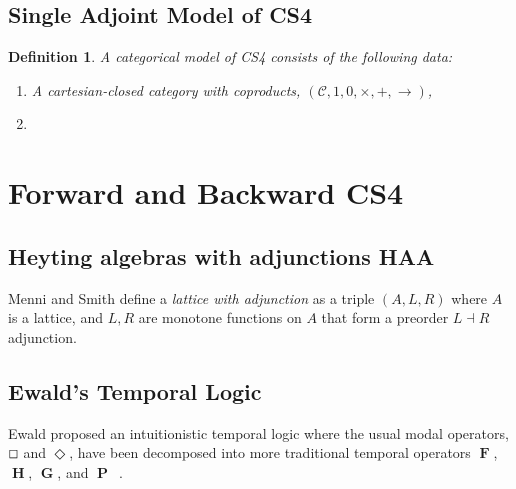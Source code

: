 \documentclass{article}
\renewcommand{\Box}{\oblong}
\newcommand{\F}{\mathop{\textbf{F}}}
\renewcommand{\P}{\mathop{\textbf{P}}}
\newcommand{\G}{\mathop{\textbf{G}}}
\renewcommand{\H}{\mathop{\textbf{H}}}
\newcommand{\cat}[1]{\mathcal{#1}}
\newcommand{\pd}[0]{\times}
\newcommand{\ihom}[0]{\rightarrow}
\newtheorem{definition}[theorem]{Definition}
\begin{document}
\subsection{Single Adjoint Model of CS4}
\label{subsec:single_adjoint_model_of_cs4}

\begin{definition}
  \label{def:CS4-single-adjoint-cat-model}
  A categorical model of CS4 consists of the following data:
  \begin{enumerate}
  \item A cartesian-closed category with coproducts, $(\cat{C},1,0,\pd,+,\ihom)$,
  \item 
  \end{enumerate}
\end{definition}



\section{Forward and Backward CS4}


\subsection{Heyting algebras with adjunctions HAA}
Menni and Smith \cite{Menni:2014} define a \textit{lattice with
  adjunction} as a triple $(A, L, R)$ where $A$ is a lattice, and $L,
R$ are monotone functions on $A$ that form a preorder $L\dashv R$
adjunction.


\subsection{Ewald's Temporal Logic}

Ewald proposed an intuitionistic temporal logic where the usual modal
operators, $\Box$ and $\Diamond$, have been decomposed into more
traditional temporal operators $\F$, $\H$, $\G$, and
$\P$~\cite{ewald1986}.
\end{document}
